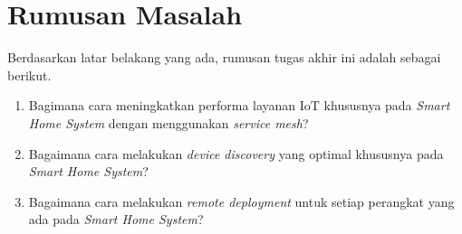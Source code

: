 \section{Rumusan Masalah}

Berdasarkan latar belakang yang ada, rumusan tugas akhir ini adalah sebagai berikut.
\begin{enumerate}
  \item Bagimana cara meningkatkan performa layanan IoT khususnya pada \textit{Smart Home System} dengan menggunakan \textit{service mesh}?
  \item Bagaimana cara melakukan \textit{device discovery} yang optimal khususnya pada \textit{Smart Home System}?
  \item Bagaimana cara melakukan \textit{remote deployment} untuk setiap perangkat yang ada pada \textit{Smart Home System}?
\end{enumerate}